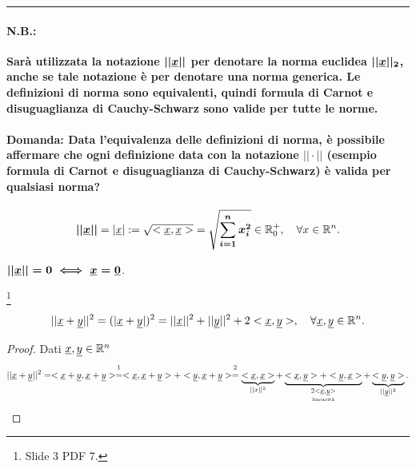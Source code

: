 \hrule

\paragraph{N.B.:} \textbf{Sarà utilizzata la notazione $\boldsymbol{||\uline x||}$ per denotare la norma euclidea $\boldsymbol{||\uline x||_2}$, anche se tale notazione è per denotare una norma generica. Le definizioni di norma sono equivalenti, quindi formula di Carnot e disuguaglianza di Cauchy-Schwarz sono valide per tutte le norme.}

\paragraph{Domanda: Data l'equivalenza delle definizioni di norma, è possibile affermare che ogni definizione data con la notazione $||\cdot||$ (esempio formula di Carnot e disuguaglianza di Cauchy-Schwarz) è valida per qualsiasi norma?}

\begin{definition}
    \begin{equation}
        \boldsymbol{||\uline x||}=|\uline x|:=\sqrt{<\uline x,\uline x>}=\boldsymbol{\sqrt{\sum_{i=1}^n x_i^2}}\in\mathbb R_0^+,\quad \forall x\in\mathbb R^n.
    \end{equation}
\end{definition}
\begin{remark}
    $\boldsymbol{||\uline x||=0\iff\uline x=\uline 0}$.
\end{remark}

\begin{proposition}
    \footnote{Slide 3 PDF 7.}
    \begin{equation}\label{eq:formula_carnot}
        ||\uline x+ \uline y||^2=(|\uline x+ \uline y|)^2=||\uline x||^2+||\uline y||^2+2<\uline x,\uline y>,\quad\forall \uline x,\uline y\in\mathbb R^n.
    \end{equation}
\end{proposition}
\begin{proof}
    Dati $\uline x,\uline y\in\mathbb R^n$
    \begin{equation*}
        ||\uline x+\uline y||^2=<\uline x+\uline y,\uline x+\uline y> \overset{\footnotemark}{=} <\uline x,\uline x+\uline y> + <\uline y,\uline x+\uline y> \overset{\footnotemark}{=} \underbrace{<\uline x,\uline x>}_{||x||^2} + \underbrace{<\uline x,\uline y>+<\uline y,\uline x>}_{\underset{\text{linearità}}{2<\uline x,\uline y>}}+\underbrace{<\uline y,\uline y>}_{||\uline y||^2}.
    \end{equation*}
\end{proof}

